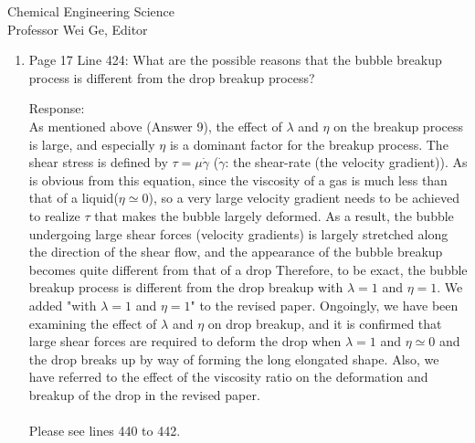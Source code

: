 \documentclass{letter}
\begin{document}
\begin{letter}{
Chemical Engineering Science\\
Professor Wei Ge, Editor\\}
\begin{enumerate}
Response: \\
In the breakup of the drop with $\lambda =1$ and $\eta = 1$ (Fig. 4), the drop starts to break at the center of the drop without 
the elongation in the first place because the drop easily breaks under the low $Re$ number. 
Consequently, the drop breakup is seemingly developed with a bulb-like shape because the liquid bridge between two mother 
drops is formed in the breakup process.
On the other hand, in the case of the bubble, very large shear forces are required to deform the bubble because $\lambda \simeq 0$ 
and $\eta \simeq 0$.
Thus, the bubble undergoing large shear forces is largely stretched along the direction of the shear flow, and the very long 
elongated bubble is finally formed. 
Accordingly, the bubble breaks up without the bulb-like shape. In the revised paper, we added these considerations.\\
\\
Please see lines 408 to 413.
\\

\par\noindent
\item
\textsf
{Page 17 Line 424: What are the possible reasons that the bubble breakup process is different from the drop breakup process?}
\vspace{3 mm}

Response: \\
As mentioned above (Answer 9), the effect of $\lambda$ and $\eta$ on the breakup process is large, and especially $\eta$ is 
a dominant factor for the breakup process. 
The shear stress is defined by $\tau = \mu$$\dot{\gamma}$ ($\dot{\gamma}$: the shear-rate (the velocity gradient)).
As is obvious from this equation, since the viscosity of a gas is much less than that of a liquid($\eta \simeq 0$), so a very large velocity 
gradient needs to be achieved to realize $\tau$ that makes the bubble largely deformed.
As a result, the bubble undergoing large shear forces (velocity gradients) is largely stretched along the direction of the shear flow, and
the appearance of the bubble breakup becomes quite different from that of a drop 
Therefore, to be exact, the bubble breakup process is different from the drop breakup with $\lambda = 1$ and $\eta =1$.  
We added "with $\lambda = 1$ and $\eta =1$" to the revised paper.
Ongoingly, we have been examining the effect of $\lambda$ and $\eta$ on drop breakup, and it is confirmed that large shear forces 
are required to deform the drop when $\lambda = 1$ and $\eta \simeq 0$ and the drop breaks up by way of forming the long 
elongated shape. 
Also, we have referred to the effect of the viscosity ratio on the deformation and breakup of the drop in the revised paper.\\
\\
Please see lines 440 to 442.
\\


\end{enumerate}
\end{letter}
\end{document}
